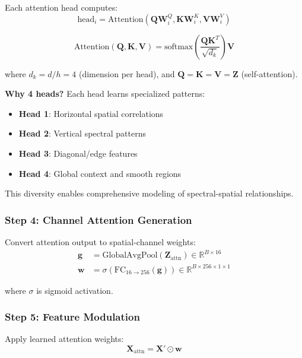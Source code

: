 \documentclass[conference]{IEEEtran}
\begin{document}
Each attention head computes:
\begin{equation}
\text{head}_i = \text{Attention}(\mathbf{Q}\mathbf{W}_i^Q, \mathbf{K}\mathbf{W}_i^K, \mathbf{V}\mathbf{W}_i^V)
\end{equation}

\begin{equation}
\text{Attention}(\mathbf{Q}, \mathbf{K}, \mathbf{V}) = \text{softmax}\left(\frac{\mathbf{Q}\mathbf{K}^T}{\sqrt{d_k}}\right)\mathbf{V}
\end{equation}

where $d_k = d/h = 4$ (dimension per head), and $\mathbf{Q} = \mathbf{K} = \mathbf{V} = \mathbf{Z}$ (self-attention).

\textbf{Why 4 heads?} Each head learns specialized patterns:
\begin{itemize}
    \item \textbf{Head 1}: Horizontal spatial correlations
    \item \textbf{Head 2}: Vertical spectral patterns
    \item \textbf{Head 3}: Diagonal/edge features
    \item \textbf{Head 4}: Global context and smooth regions
\end{itemize}

This diversity enables comprehensive modeling of spectral-spatial relationships.

\subsubsection{Step 4: Channel Attention Generation}

Convert attention output to spatial-channel weights:
\begin{equation}
\begin{aligned}
\mathbf{g} &= \text{GlobalAvgPool}(\mathbf{Z}_{\text{attn}}) \in \mathbb{R}^{B \times 16} \\
\mathbf{w} &= \sigma(\text{FC}_{16 \rightarrow 256}(\mathbf{g})) \in \mathbb{R}^{B \times 256 \times 1 \times 1}
\end{aligned}
\end{equation}

where $\sigma$ is sigmoid activation.

\subsubsection{Step 5: Feature Modulation}

Apply learned attention weights:
\begin{equation}
\mathbf{X}_{\text{attn}} = \mathbf{X}' \odot \mathbf{w}
\end{equation}
\end{document}
